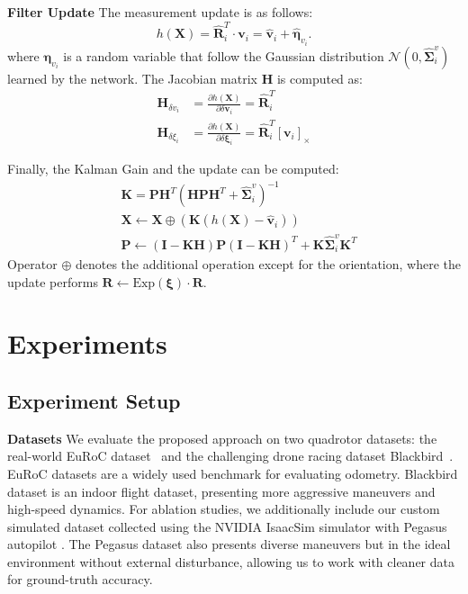 \textbf{Filter Update}
The measurement update is as follows:
\begin{equation}
    h(\mathbf{X}) = \hat{\mathbf{R}}_i^T \cdot \mathbf{v}_i =  \hat{\mathbf{v}}_i + \hat{ \boldsymbol{\eta}}_{v_i}.
\end{equation}
where $\boldsymbol{\eta}_{v_i}$ is a random variable that follow the Gaussian distribution $\mathcal{N}(0, \hat{\boldsymbol{\Sigma}}^v_i )$ learned by the network. The Jacobian matrix $\mathbf{H}$ is computed as:
\begin{equation}
\begin{split}
\mathbf{H}_{\delta v_i} &= \frac{\partial h(\mathbf{X})}{\partial \delta \mathbf{v}_i} =  \hat{\mathbf{R}}_i^T\\
\mathbf{H}_{\delta \xi_i} &= \frac{\partial h(\mathbf{X})}{\partial \delta \boldsymbol{\xi}_i} = \hat{\mathbf{R}}_i^T [\mathbf{v}_i]_\times
\end{split}
\end{equation}

Finally, the Kalman Gain and the update can be computed:
\begin{equation}
    \begin{split}
    &\mathbf{K} = \mathbf{P} \mathbf{H}^T(\mathbf{HPH}^{T} + \hat{\boldsymbol{\Sigma}}^{v}_{i} )^{-1} \\
    &\mathbf{X} \leftarrow \mathbf{X} \oplus (\mathbf{K}(h(\mathbf{X}) -  \hat{\mathbf{v}}_i)) \\
    &\mathbf{P} \leftarrow (\mathbf{I} - \mathbf{KH})\mathbf{P}(\mathbf{I}-\mathbf{KH})^T + \mathbf{K}  \hat{\boldsymbol{ \Sigma}}^v_i \mathbf{K}^T
    \end{split}
\end{equation}
Operator $\oplus$ denotes the additional operation except for the orientation, where the update performs $\mathbf{R} \leftarrow \text{Exp} (\boldsymbol{\xi}) \cdot \mathbf{R}$.


\section{Experiments}
\label{sec:airio:experiments}

\subsection{Experiment Setup}

\noindent\textbf{Datasets} We evaluate the proposed approach on two quadrotor datasets: the real-world EuRoC dataset~\cite{burri2016euroc} and the challenging drone racing dataset Blackbird~\cite{antonini2018blackbird}. EuRoC datasets are a widely used benchmark for evaluating odometry.
Blackbird dataset is an indoor flight dataset, presenting more aggressive maneuvers and high-speed dynamics.
For ablation studies, we additionally include our custom simulated dataset collected using the NVIDIA IsaacSim simulator with Pegasus autopilot \cite{Jacinto2024pegasus}.
The Pegasus dataset also presents diverse maneuvers but in the ideal environment without external disturbance, allowing us to work with cleaner data for ground-truth accuracy.

